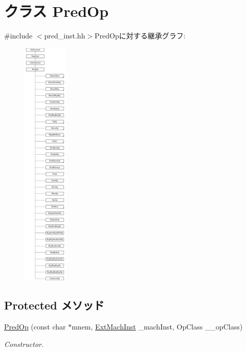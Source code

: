 \hypertarget{classArmISA_1_1PredOp}{
\section{クラス PredOp}
\label{classArmISA_1_1PredOp}
}


{\ttfamily \#include $<$pred\_\-inst.hh$>$}PredOpに対する継承グラフ:\begin{figure}[H]
\begin{center}
\leavevmode
\includegraphics[height=12cm]{classArmISA_1_1PredOp}
\end{center}
\end{figure}
\subsection*{Protected メソッド}
\begin{DoxyCompactItemize}
\item 
\hyperlink{classArmISA_1_1PredOp_a6b53ece381567170e964e803a710a329}{PredOp} (const char $\ast$mnem, \hyperlink{classStaticInst_a5605d4fc727eae9e595325c90c0ec108}{ExtMachInst} \_\-machInst, OpClass \_\-\_\-opClass)
\begin{DoxyCompactList}\small\item\em Constructor. \item\end{DoxyCompactList}\end{DoxyCompactItemize}
